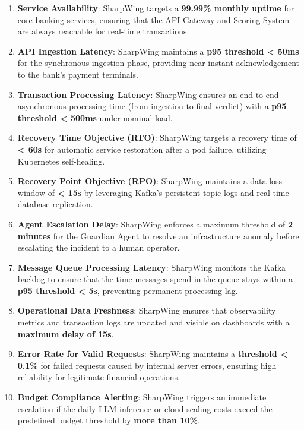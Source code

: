 \documentclass[12pt]{report}
\begin{document}
\begin{enumerate}
  \item \textbf{Service Availability}: SharpWing targets a \textbf{99.99\% monthly uptime} for core banking services, ensuring that the API Gateway and Scoring System are always reachable for real-time transactions.
  
  \item \textbf{API Ingestion Latency}: SharpWing maintains a \textbf{p95 threshold < 50ms} for the synchronous ingestion phase, providing near-instant acknowledgement to the bank's payment terminals.
  
  \item \textbf{Transaction Processing Latency}: SharpWing ensures an end-to-end asynchronous processing time (from ingestion to final verdict) with a \textbf{p95 threshold < 500ms} under nominal load.
  
  \item \textbf{Recovery Time Objective (RTO)}: SharpWing targets a recovery time of \textbf{< 60s} for automatic service restoration after a pod failure, utilizing Kubernetes self-healing.
  
  \item \textbf{Recovery Point Objective (RPO)}: SharpWing maintains a data loss window of \textbf{< 15s} by leveraging Kafka’s persistent topic logs and real-time database replication.
  
  \item \textbf{Agent Escalation Delay}: SharpWing enforces a maximum threshold of \textbf{2 minutes} for the Guardian Agent to resolve an infrastructure anomaly before escalating the incident to a human operator.
  
  \item \textbf{Message Queue Processing Latency}: SharpWing monitors the Kafka backlog to ensure that the time messages spend in the queue stays within a \textbf{p95 threshold < 5s}, preventing permanent processing lag.
  
  \item \textbf{Operational Data Freshness}: SharpWing ensures that observability metrics and transaction logs are updated and visible on dashboards with a \textbf{maximum delay of 15s}.
  
  \item \textbf{Error Rate for Valid Requests}: SharpWing maintains a \textbf{threshold < 0.1\%} for failed requests caused by internal server errors, ensuring high reliability for legitimate financial operations.
  
  \item \textbf{Budget Compliance Alerting}: SharpWing triggers an immediate escalation if the daily LLM inference or cloud scaling costs exceed the predefined budget threshold by \textbf{more than 10\%}.
  
\end{enumerate}
\end{document}
